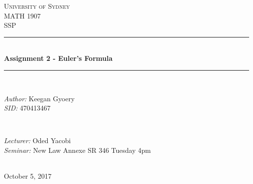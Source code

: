 \documentclass[a4paper]{article}
\begin{document}
\begin{titlepage}

\newcommand{\HRule}{\rule{\linewidth}{0.5mm}} %

\center %
 
\textsc{\LARGE University of Sydney}\\[1.5cm] %
\textsc{\Large MATH 1907}\\[0.5cm] %
\textsc{\large SSP}\\[0.5cm] %

\HRule \\[0.4cm]
{ \huge \bfseries Assignment 2 - Euler's Formula}\\[0.4cm] %
\HRule \\[1.5cm]

\begin{minipage}{0.4\textwidth}
\begin{flushleft} \large
\emph{Author:}
Keegan Gyoery %
\\
\emph{SID:}
470413467
\end{flushleft}
\end{minipage}
~
\begin{minipage}{0.4\textwidth}
\begin{flushright} \large
\emph{Lecturer:} 
Oded Yacobi %
\\
\emph{Seminar:}
New Law Annexe SR 346
Tuesday 4pm
\end{flushright}
\end{minipage}\\[4cm]

{\large October 5, 2017}\\[3cm] %

\vfill %

\end{titlepage}

\end{document}
